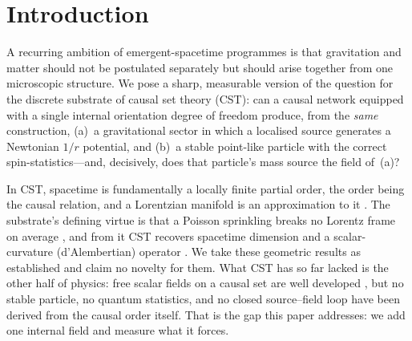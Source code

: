 \documentclass[aps,prd,reprint,nofootinbib,superscriptaddress,floatfix]{revtex4-2}
\theoremstyle{plain}
\begin{document}
\maketitle

\section{Introduction}\label{sec:intro}

A recurring ambition of emergent-spacetime programmes is that gravitation and matter
should not be postulated separately but should arise together from one microscopic
structure. We pose a sharp, measurable version of the question for the discrete
substrate of causal set theory (CST): can a causal network equipped with a single
internal orientation degree of freedom produce, from the \emph{same} construction,
(a)~a gravitational sector in which a localised source generates a Newtonian
$1/r$ potential, and (b)~a stable point-like particle with the correct
spin-statistics---and, decisively, does that particle's mass source the field
of~(a)?

In CST, spacetime is fundamentally a locally finite partial order, the order being
the causal relation, and a Lorentzian manifold is an approximation to it
\cite{BLMS1987}. The substrate's defining virtue is that a Poisson sprinkling breaks
no Lorentz frame on average \cite{BombelliHensonSorkin2009}, and from it CST recovers
spacetime dimension and a scalar-curvature (d'Alembertian) operator
\cite{Myrheim1978,BenincasaDowker2010}. We take these geometric results as
established and claim no novelty for them. What CST has so far lacked is the other
half of physics: free scalar fields on a causal set are well developed
\cite{Surya2019}, but no stable particle, no quantum statistics, and no closed
source--field loop have been derived from the causal order itself. That is the gap
this paper addresses: we add one internal field and measure what it forces.
\end{document}
